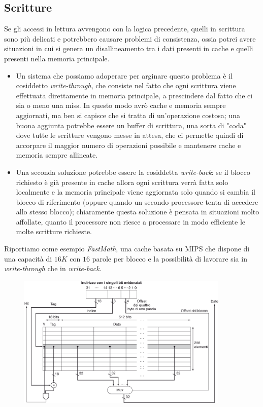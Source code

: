 \documentclass[class=book, crop=false, oneside]{standalone}
\begin{document}
\subsection{Scritture}
Se gli accessi in lettura avvengono con la logica precedente, quelli in scrittura sono più delicati e potrebbero causare problemi di consistenza, ossia potrei avere situazioni in cui si genera un disallineamento tra i dati presenti in cache e quelli presenti nella memoria principale.
\begin{itemize}
	\item Un sistema che possiamo adoperare per arginare questo problema è il cosiddetto \emph{write-through}, che consiste nel fatto che ogni scrittura viene effettuata direttamente in memoria principale, a prescindere dal fatto che ci sia o meno una miss. In questo modo avrò cache e memoria sempre aggiornati, ma ben si capisce che si tratta di un'operazione costosa; una buona aggiunta potrebbe essere un buffer di scrittura, una sorta di "coda" dove tutte le scritture vengono messe in attesa, che ci permette quindi di accorpare il maggior numero di operazioni possibile e mantenere cache e memoria sempre allineate.
	\item Una seconda soluzione potrebbe essere la cosiddetta \emph{write-back}: se il blocco richiesto è già presente in cache allora ogni scrittura verrà fatta solo localmente e la memoria principale viene aggiornata solo quando si cambia il blocco di riferimento (oppure quando un secondo processore tenta di accedere allo stesso blocco); chiaramente questa soluzione è pensata in situazioni molto affollate, quanto il processore non riesce a processare in modo efficiente le molte scritture richieste.
\end{itemize}
Riportiamo come esempio \emph{FastMath}, una cache basata su MIPS che dispone di una capacità di \(16K\) con \(16\) parole per blocco e la possibilità di lavorare sia in \emph{write-through} che in \emph{write-back}.

\begin{figure}[H]
	\centering
	\includegraphics[width=0.9\textwidth,keepaspectratio]{astmips}
\end{figure}
\end{document}
